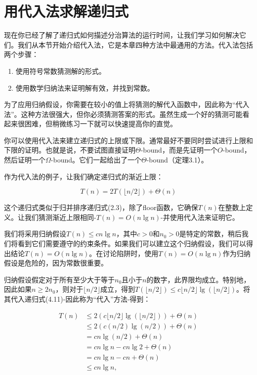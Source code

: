 \documentclass[lang=cn,newtx,10pt,scheme=chinese]{elegantbook}
\begin{document}
\section{用代入法求解递归式}\label{section-4.3}

现在你已经了解了递归式如何描述分治算法的运行时间，让我们学习如何解决它们。我们从本节开始介绍代入法，它是本章四种方法中最通用的方法。代入法包括两个步骤：

\begin{enumerate}
\item 使用符号常数猜测解的形式。
\item 使用数学归纳法来证明解有效，并找到常数。
\end{enumerate}

为了应用归纳假设，你需要在较小的值上将猜测的解代入函数中，因此称为“代入法”。这种方法很强大，但你必须猜测答案的形式。虽然生成一个好的猜测可能看起来很困难，但稍微练习一下就可以快速提高你的直觉。

你可以使用代入法来建立递归式的上限或下限。通常最好不要同时尝试进行上限和下限的证明。也就是说，不要试图直接证明$\Theta$-bound，而是先证明一个$O$-bound，然后证明一个$\Omega$-bound。它们一起给出了一个$\Theta$-bound（定理3.1）。

作为代入法的例子，让我们确定递归式的渐近上限：

\begin{equation}
T(n)=2 T(\lfloor n / 2\rfloor)+\Theta(n)
\end{equation}

这个递归式类似于归并排序递归式(2.3)，除了floor函数，它确保$T(n)$在整数上定义。让我们猜测渐近上限相同-$T(n)=O(n \lg n)$-并使用代入法来证明它。

我们将采用归纳假设$T(n) \leq c n \lg n$，其中$c>0$和$n_0>0$是特定的常数，稍后我们将看到它们需要遵守的约束条件。如果我们可以建立这个归纳假设，我们可以得出结论$T(n)=O(n \lg n)$。在讨论陷阱时，使用$T(n)=O(n \lg n)$作为归纳假设是危险的，因为常数很重要。

归纳假设假定对于所有至少大于等于$n_0$且小于$n$的数字，此界限均成立。特别地，因此如果$n \geq 2 n_0$，则对于$\lfloor n / 2\rfloor$成立，得到$T(\lfloor n / 2\rfloor) \leq c\lfloor n / 2\rfloor \lg (\lfloor n / 2\rfloor)$。将其代入递归式(4.11)-因此称为“代入”方法-得到：

$$
\begin{aligned}
T(n) & \leq 2(c\lfloor n / 2\rfloor \lg (\lfloor n / 2\rfloor))+\Theta(n) \\
& \leq 2(c(n / 2) \lg (n / 2))+\Theta(n) \\
& =c n \lg (n / 2)+\Theta(n) \\
& =c n \lg n-c n \lg 2+\Theta(n) \\
& =c n \lg n-c n+\Theta(n) \\
& \leq c n \lg n,
\end{aligned}
$$
\end{document}
